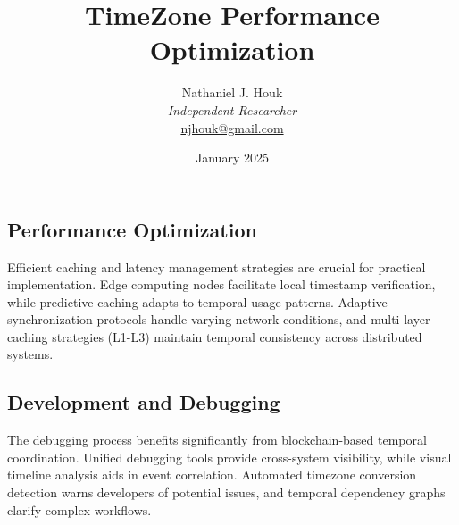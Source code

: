 \documentclass{article}
\title{TimeZone Performance Optimization}
\author{Nathaniel J. Houk\\
\textit{Independent Researcher}\\
\href{mailto:njhouk@gmail.com}{njhouk@gmail.com}}
\date{January 2025}
\begin{document}
\maketitle
\tableofcontents

\subsection{Performance Optimization}
Efficient caching and latency management strategies are crucial for practical implementation. Edge computing nodes facilitate local timestamp verification, while predictive caching adapts to temporal usage patterns. Adaptive synchronization protocols handle varying network conditions, and multi-layer caching strategies (L1-L3) maintain temporal consistency across distributed systems.

\subsection{Development and Debugging}
The debugging process benefits significantly from blockchain-based temporal coordination. Unified debugging tools provide cross-system visibility, while visual timeline analysis aids in event correlation. Automated timezone conversion detection warns developers of potential issues, and temporal dependency graphs clarify complex workflows.



\end{document}
